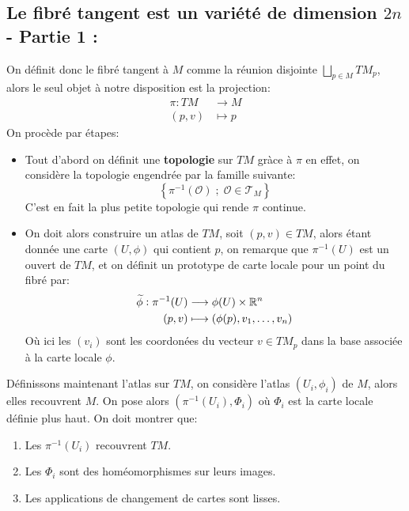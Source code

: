    \subsection*{Le fibré tangent est un variété de dimension \( 2n \) - Partie 1 {:}}
      On définit donc le fibré tangent à \( M \) comme la réunion disjointe \( \bigsqcup_{p \in M} TM_p \), alors le seul objet à notre disposition est la projection:
      \[ 
         \begin{aligned}
            \pi : TM &\longrightarrow M \\
            (p, v) &\longmapsto p
         \end{aligned} 
      \]
      On procède par étapes:
      \begin{itemize}
         \item Tout d'abord on définit une \textbf{topologie} sur \( TM \) gràce à \( \pi \) en effet, on considère la topologie engendrée par la famille suivante:
         \[ 
            \left\{  \pi^{-1}(\mathcal{O}) \; ; \; \mathcal{O} \in \mathcal{T}_M \right\} 
         \]
         C'est en fait la plus petite topologie qui rende \( \pi \) continue.
         \item On doit alors construire un atlas de \( TM \), soit \( (p, v) \in TM\), alors étant donnée une carte \( (U, \phi) \) qui contient \( p \), on remarque que \( \pi^{-1}(U) \) est un ouvert de \( TM \), et on définit un prototype de carte locale pour un point du fibré par:
         \[ 
            \begin{aligned}
               \widetilde{\phi} : \pi^{-1}(U) &\longrightarrow \phi(U) \times \mathbb{R}^n \\
               (p, v) &\longmapsto (\phi(p), v_1, \ldots, v_n)
            \end{aligned}
         \]
         Où ici les \( (v_i) \) sont les coordonées du vecteur \( v \in TM_p \) dans la base associée à la carte locale \( \phi \).
      \end{itemize}
      Définissons maintenant l'atlas sur \( TM \), on considère l'atlas \( (U_i, \phi_i) \) de \( M \), alors elles recouvrent \( M \). On pose alors \((\pi^{-1}(U_i), \Phi_i)\) où \( \Phi_i \) est la carte locale définie plus haut. On doit montrer que:
      \begin{enumerate}
         \item Les \( \pi^{-1}(U_i) \) recouvrent \( TM \).
         \item Les \( \Phi_i \) sont des homéomorphismes sur leurs images.
         \item Les applications de changement de cartes sont lisses.
      \end{enumerate}
